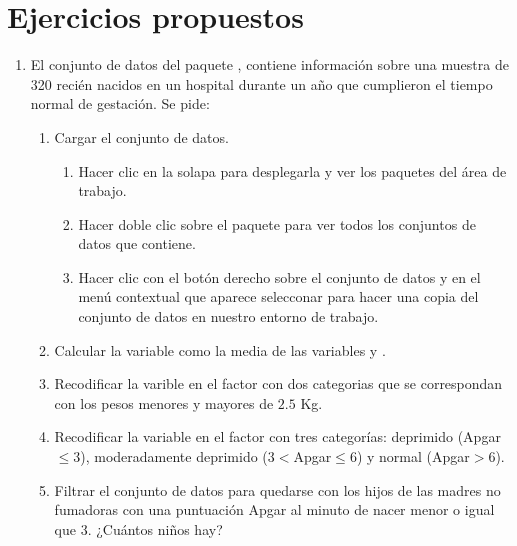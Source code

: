\section{Ejercicios propuestos}
\begin{enumerate}[leftmargin=*]
\item  El conjunto de datos  del paquete , contiene información sobre una
muestra de 320 recién nacidos en un hospital durante un año que cumplieron el tiempo normal de gestación. 
Se pide:
\begin{enumerate}
\item Cargar el conjunto de datos.
\begin{indicacion}
\begin{enumerate}
\item Hacer clic en la solapa  para desplegarla y ver los paquetes del área de trabajo. 
\item Hacer doble clic sobre el paquete  para ver todos los conjuntos de datos que contiene. 
\item Hacer clic con el botón derecho sobre el conjunto de datos  y en el menú contextual que
aparece selecconar  para hacer una copia del conjunto de datos en nuestro entorno de trabajo. 
\end{enumerate}
\end{indicacion}

\item Calcular la variable  como la media de las variables  y .
\item Recodificar la varible  en el factor  con dos categorias que se
correspondan con los pesos menores y mayores de $2.5$ Kg.
\item Recodificar la variable  en el factor  con tres categorías: deprimido
(Apgar$\leq 3$), moderadamente deprimido ($3<$Apgar$\leq 6$) y normal (Apgar$>6$).
\item Filtrar el conjunto de datos para quedarse con los hijos de las madres no fumadoras con una puntuación Apgar al
minuto de nacer menor o igual que 3. ¿Cuántos niños hay?
\end{enumerate}
\end{enumerate}